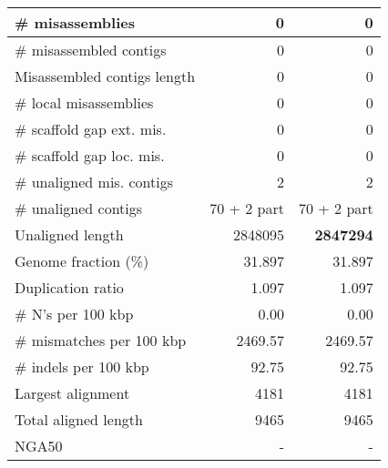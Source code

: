 \documentclass[12pt,a4paper]{article}
\begin{document}
\begin{table}[ht]
\begin{center}
\begin{tabular}{|l*{2}{|r}|}
\# misassemblies & 0 & 0 \\ \hline
\# misassembled contigs & 0 & 0 \\ \hline
Misassembled contigs length & 0 & 0 \\ \hline
\# local misassemblies & 0 & 0 \\ \hline
\# scaffold gap ext. mis. & 0 & 0 \\ \hline
\# scaffold gap loc. mis. & 0 & 0 \\ \hline
\# unaligned mis. contigs & 2 & 2 \\ \hline
\# unaligned contigs & 70 + 2 part & 70 + 2 part \\ \hline
Unaligned length & 2848095 & {\bf 2847294} \\ \hline
Genome fraction (\%) & 31.897 & 31.897 \\ \hline
Duplication ratio & 1.097 & 1.097 \\ \hline
\# N's per 100 kbp & 0.00 & 0.00 \\ \hline
\# mismatches per 100 kbp & 2469.57 & 2469.57 \\ \hline
\# indels per 100 kbp & 92.75 & 92.75 \\ \hline
Largest alignment & 4181 & 4181 \\ \hline
Total aligned length & 9465 & 9465 \\ \hline
NGA50 & - & - \\ \hline
\end{tabular}
\end{center}
\end{table}
\end{document}
